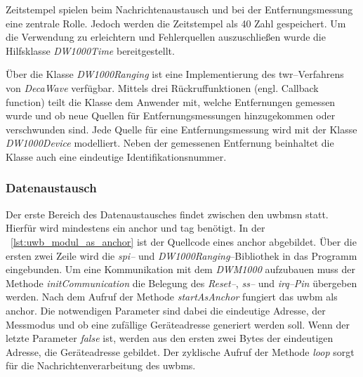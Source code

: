 Zeitstempel spielen beim Nachrichtenaustausch und bei der Entfernungsmessung eine zentrale Rolle. Jedoch werden die Zeitstempel als \SI{40}{\bit} Zahl gespeichert. Um die Verwendung zu erleichtern und Fehlerquellen auszuschließen wurde die Hilfsklasse \textit{DW1000Time} bereitgestellt.

Über die Klasse \textit{DW1000Ranging} ist eine Implementierung des \Gls{twr}--Verfahrens von \textit{DecaWave} verfügbar. Mittels drei Rückruffunktionen (engl. Callback function) teilt die Klasse dem Anwender mit, welche Entfernungen gemessen wurde und ob neue Quellen für Entfernungsmessungen hinzugekommen oder verschwunden sind. Jede Quelle für eine Entfernungsmessung wird mit der Klasse \textit{DW1000Device} modelliert. Neben der gemessenen Entfernung beinhaltet die Klasse auch eine eindeutige Identifikationsnummer. 


\begin{comment}
------------------------------------------------------------------------------------------
- Basisscript
	- Wie sieht ein ganz triviales Beispiel aus?
	- Wie ist der Programmablauf des Beispiels?
	- Für das DW1000Ranging
	- Wie kann man Daten austauschen? JSON
- Datenaustausch zwischen Host und µC
- ArduinoJson Assistant
	- https://arduinojson.org/assistant/
\end{comment}
\subsubsection{Datenaustausch}

Der erste Bereich des Datenaustausches findet zwischen den \Glspl{uwbm}n statt. Hierfür wird mindestens ein \Gls{anchor} und \Gls{tag} benötigt. In der \lstlistingname~\ref{lst:uwb_modul_as_anchor} ist der Quellcode eines \Gls{anchor} abgebildet.
Über die ersten zwei Zeile wird die \textit{\Gls{spi}--} und \textit{DW1000Ranging}--Bibliothek in das Programm eingebunden.
Um eine Kommunikation mit dem \textit{DWM1000} aufzubauen muss der Methode \textit{initCommunication} die Belegung des \textit{Reset--}, \textit{\Gls{ss}--} und \textit{\Gls{irq}--Pin} übergeben werden.
Nach dem Aufruf der Methode \textit{startAsAnchor} fungiert das \Gls{uwbm} als \Gls{anchor}. Die notwendigen Parameter sind dabei die eindeutige Adresse, der Messmodus und ob eine zufällige Geräteadresse generiert werden soll. Wenn der letzte Parameter \textit{false} ist, werden aus den ersten zwei Bytes der eindeutigen Adresse, die Geräteadresse gebildet. Der zyklische Aufruf der Methode \textit{loop} sorgt für die Nachrichtenverarbeitung des \Gls{uwbm}s.

